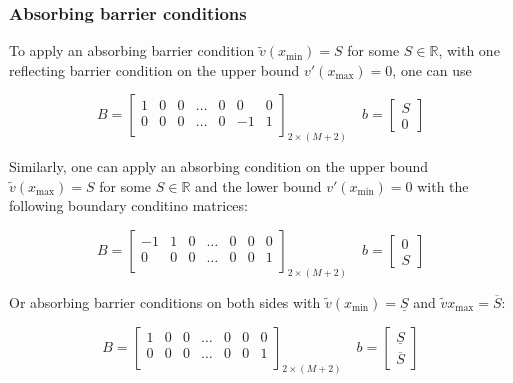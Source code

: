 \documentclass[11pt]{article}
\theoremstyle{definition}
\begin{document}
\subsubsection{Absorbing barrier conditions}\label{subsubsec:absorbing-barrier-conditions-irregular}

To apply an absorbing barrier condition $\tilde{v}(x_{\min}) =S$ for some $S \in \mathbb{R}$, with one reflecting barrier condition on the upper bound $v'(x_{\max}) = 0$, one can use

\begin{equation}\label{eq:absorbing-barrier-matrix}
B = \begin{bmatrix}
1 & 0 & 0 & \dots & 0 & 0 & 0 \\
0 & 0 & 0 & \dots & 0 & -1 & 1\\
\end{bmatrix}_{2 \times (M+2)} \quad
b = \begin{bmatrix}
S \\
0
\end{bmatrix}
\end{equation}

Similarly, one can apply an absorbing condition on the upper bound  $\tilde{v}(x_{\max}) =S$ for some $S \in \mathbb{R}$ and the lower bound $v'(x_{\min}) = 0$ with the following boundary conditino matrices:


\begin{equation}\label{eq:absorbing-barrier-matrix-ub}
B = \begin{bmatrix}
-1 & 1 & 0 & \dots & 0 & 0 & 0 \\
0 & 0 & 0 & \dots & 0 & 0 & 1\\
\end{bmatrix}_{2 \times (M+2)} \quad
b = \begin{bmatrix}
0 \\
S
\end{bmatrix}
\end{equation}

Or absorbing barrier conditions on both sides with $\tilde{v}( x_{\min} )  = \underline{S}  $ and $\tilde{v}{x_{\max} } = \overline{S}$:


\begin{equation}\label{eq:absorbing-barrier-matrix-both}
B = \begin{bmatrix}
1 & 0 & 0 & \dots & 0 & 0 & 0 \\
0 & 0 & 0 & \dots & 0 &  0 & 1\\
\end{bmatrix}_{2 \times (M+2)} \quad
b = \begin{bmatrix}
\underline{S} \\
\overline{S}
\end{bmatrix}
\end{equation}
\end{document}
